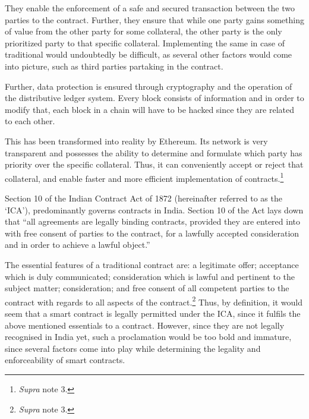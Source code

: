 \begin{multicols}{2}

\noi
They enable the enforcement of a safe and secured transaction between the two parties to the
contract. Further, they ensure that while one party gains something of value from the other
party for some collateral, the other party is the only prioritized party to that specific collateral. Implementing the same in case of traditional would undoubtedly be difficult, as
several other factors would come into picture, such as third parties partaking in the contract. 

\noi
Further, data protection is ensured through cryptography and the operation of the distributive
ledger system. Every block consists of information and in order to modify that, each block in
a chain will have to be hacked since they are related to each other.

\newpage

\noi
This has been transformed into reality by Ethereum. Its network is very transparent and
possesses the ability to determine and formulate which party has priority over the specific
collateral. Thus, it can conveniently accept or reject that collateral, and enable faster and
more efficient implementation of contracts.\footnote{\textit{Supra} note 3.}

\vspace{-.1cm}


\vspace{-.1cm}

\noi
Section 10 of the Indian Contract Act of 1872 (hereinafter referred to as the ‘ICA’),
predominantly governs contracts in India. Section 10 of the Act lays down that “all
agreements are legally binding contracts, provided they are entered into with free consent of
parties to the contract, for a lawfully accepted consideration and in order to achieve a lawful
object.”

\vspace{-.1cm}

\noi
The essential features of a traditional contract are: a legitimate offer; acceptance which is
duly communicated; consideration which is lawful and pertinent to the subject matter;
consideration; and free consent of all competent parties to the contract with regards to all
aspects of the contract.\footnote{\textit{Supra} note 3.} Thus, by definition, it would seem that a smart contract is legally
permitted under the ICA, since it fulfils the above mentioned essentials to a contract.
However, since they are not legally recognised in India yet, such a proclamation would be too
bold and immature, since several factors come into play while determining the legality and
enforceability of smart contracts. 


\end{multicols}
